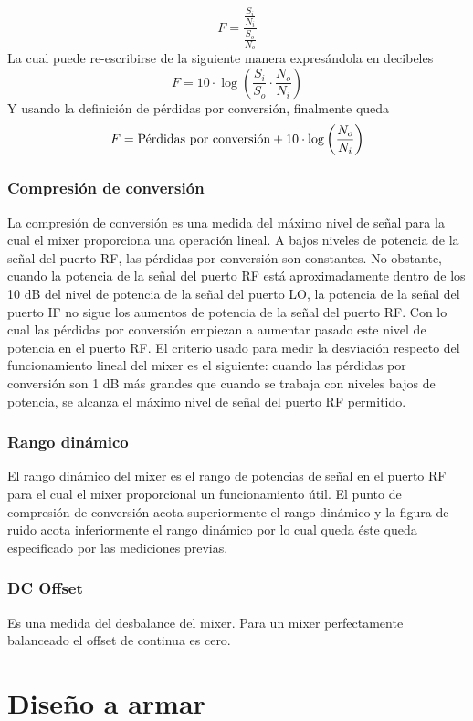\documentclass[a4paper,10pt]{article}
\begin{document}
		$$F=\frac{\frac{S_i}{N_i}}{\frac{S_o}{N_o}}$$
		La cual puede re-escribirse de la siguiente manera expres\'andola en decibeles 
		$$F=10\cdot\log\left(\frac{S_i}{S_o}\cdot\frac{N_o}{N_i}\right)$$
		Y usando la definici\'on de p\'erdidas por conversi\'on, finalmente queda
		$$F=\textmd{P\'erdidas por conversi\'on}+10\cdot\log\left(\frac{N_o}{N_i}\right)$$
		
		\subsubsection{Compresi\'on de conversi\'on}
		La compresi\'on de conversi\'on es una medida del m\'aximo nivel de se\~nal para la cual el mixer proporciona una operaci\'on lineal. A bajos niveles de potencia de la se\~nal del puerto RF, las p\'erdidas por conversi\'on son constantes. No obstante, cuando la potencia de la se\~nal del puerto RF est\'a aproximadamente dentro de los 10 dB del nivel de potencia de la se\~nal del puerto LO, la potencia de la se\~nal del puerto IF no sigue los aumentos de potencia de la se\~nal del puerto RF. Con lo cual las p\'erdidas por conversi\'on empiezan a aumentar pasado este nivel de potencia en el puerto RF. El criterio usado para medir la desviaci\'on respecto del funcionamiento lineal del mixer es el siguiente: cuando las p\'erdidas por conversi\'on son 1 dB m\'as grandes que cuando se trabaja con niveles bajos de potencia, se alcanza el m\'aximo nivel de se\~nal del puerto RF permitido. 
		
		\subsubsection{Rango din\'amico}
		El rango din\'amico del mixer es el rango de potencias de se\~nal en el puerto RF para el cual el mixer proporcional un funcionamiento \'util.
		El punto de compresi\'on de conversi\'on acota superiormente el rango din\'amico y la figura de ruido acota inferiormente el rango din\'amico por lo cual queda \'este queda especificado por las mediciones previas.

		\subsubsection{DC Offset}
		Es una medida del desbalance del mixer. Para un mixer perfectamente balanceado el offset de continua es cero.


	\section{Diseño a armar}
	
\end{document}
